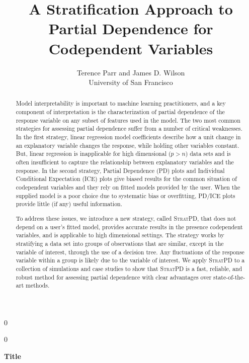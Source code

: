 \documentclass[12pt]{article}
\newcommand{\blind}{0}
\newcommand{\spd}{\fontfamily{cmr}\textsc{\small StratPD}}
\begin{document}
\def\spacingset#1{\renewcommand{\baselinestretch}%
{#1}\small\normalsize} \spacingset{1}



\blind
{
  \title{\bf A Stratification Approach to Partial Dependence for Codependent Variables}

  \author{Terence Parr and James D. Wilson\\
      University of San Francisco\\
}
  \maketitle
} \fi

\blind
{
  \bigskip
  \bigskip
  \bigskip
  \begin{center}
    {\LARGE\bf Title}
\end{center}
  \medskip
} \fi

\bigskip
\begin{abstract}
Model interpretability is important to machine learning practitioners, and a key component of  interpretation is the characterization of partial dependence of the response variable on any subset of features used in the model. The two most common strategies for assessing partial dependence suffer from a number of critical weaknesses. In the first strategy, linear regression model coefficients describe how a unit change in an explanatory variable changes the response, while holding other variables constant. But, linear regression is inapplicable for high dimensional ($p>n$) data sets and is often insufficient to capture the relationship between explanatory variables and the response.  In the second strategy, Partial Dependence (PD) plots and Individual Conditional Expectation (ICE) plots give biased results for the common situation of codependent variables and they rely on fitted models provided by the user. When the supplied model is a poor choice due to systematic bias or overfitting, PD/ICE plots provide little (if any) useful information.  

To address these issues, we introduce a new strategy, called \spd{}, that does not depend on a user's fitted model, provides accurate results in the presence codependent variables, and is applicable to high dimensional settings. The strategy works by stratifying a data set into groups of observations that are similar, except in the variable of interest, through the use of a decision tree. Any fluctuations of the response variable within a group is likely due to the variable of interest. We apply \spd{} to a collection of simulations and case studies to show that \spd{} is a fast, reliable, and robust method for assessing partial dependence with clear advantages over state-of-the-art methods. 
\end{abstract}
\end{document}
